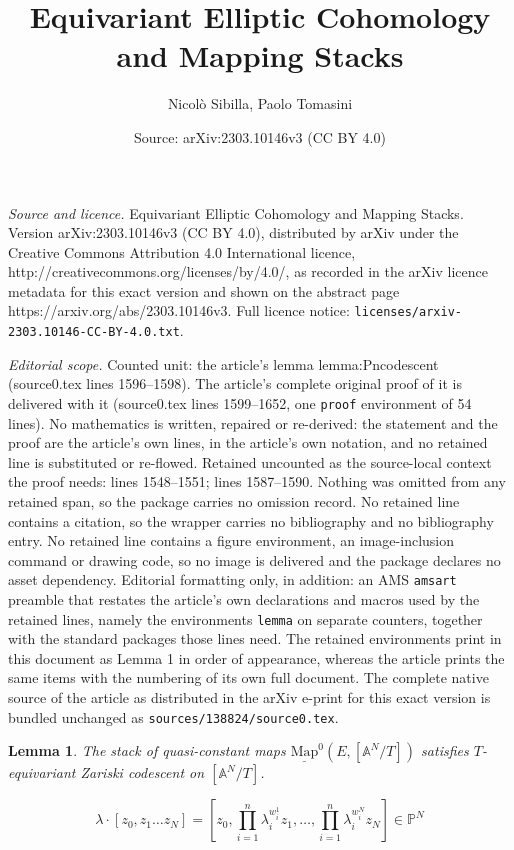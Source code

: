 \documentclass[10pt,a4paper]{amsart}
\title{Equivariant Elliptic Cohomology and Mapping Stacks}
\author{Nicol\`o Sibilla, Paolo Tomasini}
\date{Source: arXiv:2303.10146v3 (CC BY 4.0)}
\newtheorem{lemma}{Lemma}
\newcommand{\Mapo}[2]{\underline{\mathrm{Map}}^{0}\left (#1,#2\right )}
\newcommand{\bP}{\mathbb{P}}
\begin{document}
\maketitle

\noindent\emph{Source and licence.} Equivariant Elliptic Cohomology and Mapping Stacks. Version arXiv:2303.10146v3 (CC BY 4.0), distributed by arXiv under the Creative Commons Attribution 4.0 International licence, http://creativecommons.org/licenses/by/4.0/, as recorded in the arXiv licence metadata for this exact version and shown on the abstract page https://arxiv.org/abs/2303.10146v3. Full licence notice: \texttt{licenses/arxiv-2303.10146-CC-BY-4.0.txt}.\par\smallskip

\noindent\textit{Editorial scope.} Counted unit: the article's lemma lemma:Pncodescent (source0.tex lines 1596--1598). The article's complete original proof of it is delivered with it (source0.tex lines 1599--1652, one \texttt{proof} environment of 54 lines). No mathematics is written, repaired or re-derived: the statement and the proof are the article's own lines, in the article's own notation, and no retained line is substituted or re-flowed.  Retained uncounted as the source-local context the proof needs: lines 1548--1551; lines 1587--1590.  Nothing was omitted from any retained span, so the package carries no omission record.  No retained line contains a citation, so the wrapper carries no bibliography and no bibliography entry.  No retained line contains a figure environment, an image-inclusion command or drawing code, so no image is delivered and the package declares no asset dependency.  Editorial formatting only, in addition: an AMS \texttt{amsart} preamble that restates the article's own declarations and macros used by the retained lines, namely the environments \texttt{lemma} on separate counters, together with the standard packages those lines need.  The retained environments print in this document as Lemma 1 in order of appearance, whereas the article prints the same items with the numbering of its own full document.  The complete native source of the article as distributed in the arXiv e-print for this exact version is bundled unchanged as \texttt{sources/138824/source0.tex}.
	\begin{lemma}
    \label{lemma:Ancodescent}
The stack of quasi-constant maps $\Mapo{E}{[\mathbb{A}^N/T]}$ satisfies $T$-equivariant Zariski codescent on $[\mathbb{A}^N/T]$. 
\end{lemma}

\begin{equation}
\label{standardform}
\lambda  \cdot [z_0, z_1 \ldots z_N] =    [z_0, \prod_{i=1}^{n}\lambda_i^{w^1_i}z_1,\dots,\prod_{i=1}^{n}\lambda_i^{w^N_i}z_N] \in \bP^N  
\end{equation} 
\end{document}
